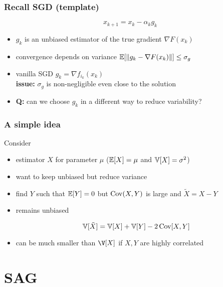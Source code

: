 \documentclass{beamer}
\begin{document}
\begin{frame}
  \frametitle{Recall SGD (template)}
  \begin{equation}
    x_{k+1} = x_k - \alpha_k g_k
  \end{equation}
  \begin{itemize}
    \item $g_k$ is an unbiased estimator of the true gradient $\nabla F(x_k)$
    \item convergence depends on variance $\mathbb{E} [ \Vert g_k - \nabla F(x_k) \Vert ] \le \sigma_g$
    \item vanilla SGD $g_k = \nabla f_{i_k}(x_k)$ \\
          \textbf{issue:} $\sigma_g$ is non-negligible even close to the solution
    \item \textbf{Q:} can we choose $g_k$ in a different way to reduce variability?
  \end{itemize}

\end{frame}


\begin{frame}
  \frametitle{A simple idea}
  Consider
  \begin{itemize}
    \item estimator $X$ for parameter $\mu$ ($\mathbb{E}[X]=\mu$ and $\mathbb{V}[X]=\sigma^2$)
    \item want to keep unbiased but reduce variance
    \item find $Y$ such that $\mathbb{E}[Y] = 0$ but $\operatorname*{Cov} (X,Y)$ is large and $\tilde{X}=X-Y$
    \item remains unbiased

          \begin{equation}
            \mathbb{V}[\tilde{X}] = \mathbb{V}[X]+\mathbb{V}[Y]-2\operatorname*{Cov}[X,Y]
          \end{equation}
    \item can be much smaller than $\V[X]$ if $X,Y$ are highly correlated
  \end{itemize}
\end{frame}

\section{SAG}%
\label{sec:}
\end{document}
